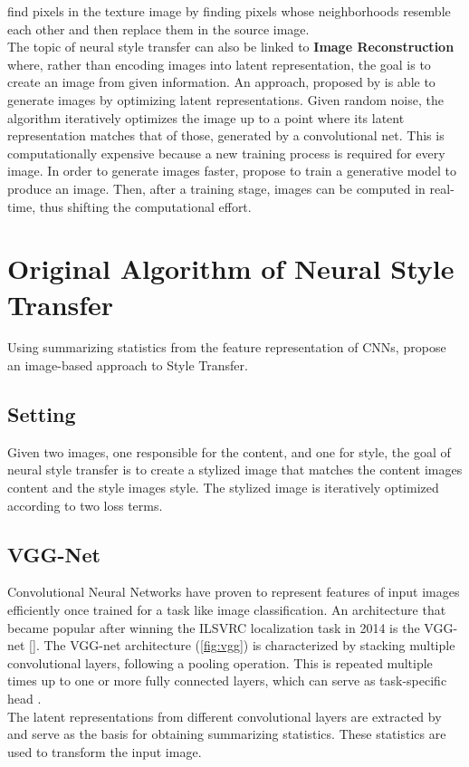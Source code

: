 \documentclass{seminar}
\begin{document}
	\cite{efros1999texture} find pixels in the texture image by finding pixels whose neighborhoods resemble each other and then replace them in the source image.\\
	The topic of neural style transfer can also be linked to \textbf{Image Reconstruction} where, rather than encoding images into latent representation, the goal is to create an image from given information. An approach, proposed by \cite{mahendran2015understanding} is able to generate images by optimizing latent representations. Given random noise, the algorithm iteratively optimizes the image up to a point where its latent representation matches that of those, generated by a convolutional net.
	This is computationally expensive because a new training process is required for every image. In order to generate images faster, \cite{dosovitskiy2016generating} propose to train a generative model to produce an image. Then, after a training stage, images can be computed in real-time, thus shifting the computational effort.
	
	
	
	
	\section{Original Algorithm of Neural Style Transfer}
	Using summarizing statistics from the feature representation of CNNs, \cite{gatys2015neural} propose an image-based approach to Style Transfer. 
	\subsection{Setting}
	Given two images, one responsible for the content, and one for style, the goal of neural style transfer is to create a stylized image that matches the content images content and the style images style. The stylized image is iteratively optimized according to two loss terms.
	
	\subsection{VGG-Net}
	Convolutional Neural Networks have proven to represent features of input images efficiently once trained for a task like image classification. An architecture that became popular after winning the ILSVRC localization task in 2014 is the VGG-net [\cite{ILSVRC15}]. The VGG-net architecture (\ref{fig:vgg}) is characterized by stacking multiple convolutional layers, following a pooling operation. This is repeated multiple times up to one or more fully connected layers, which can serve as task-specific head \cite{simonyan2014very}.\\
	The latent representations from different convolutional layers are extracted by \cite{gatys2015neural} and serve as the basis for obtaining summarizing statistics.
	These statistics are used to transform the input image.
	
\end{document}
